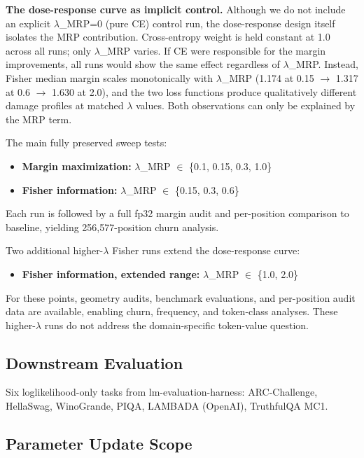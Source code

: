 \documentclass[
  11pt,
]{article}
\providecommand{\tightlist}{%
  \setlength{\itemsep}{0pt}\setlength{\parskip}{0pt}}
\begin{document}
\textbf{The dose-response curve as implicit control.} Although we do not
include an explicit $\lambda$\_MRP=0 (pure CE) control run, the dose-response
design itself isolates the MRP contribution. Cross-entropy weight is
held constant at 1.0 across all runs; only $\lambda$\_MRP varies. If CE were
responsible for the margin improvements, all runs would show the same
effect regardless of $\lambda$\_MRP. Instead, Fisher median margin scales
monotonically with $\lambda$\_MRP (1.174 at 0.15 $\rightarrow$ 1.317 at 0.6 $\rightarrow$ 1.630 at 2.0),
and the two loss functions produce qualitatively different damage
profiles at matched $\lambda$ values. Both observations can only be explained by
the MRP term.

The main fully preserved sweep tests:

\begin{itemize}
\tightlist
\item
  \textbf{Margin maximization:} $\lambda$\_MRP $\in$ \{0.1, 0.15, 0.3, 1.0\}
\item
  \textbf{Fisher information:} $\lambda$\_MRP $\in$ \{0.15, 0.3, 0.6\}
\end{itemize}

Each run is followed by a full fp32 margin audit and per-position
comparison to baseline, yielding 256,577-position churn analysis.

Two additional higher-$\lambda$ Fisher runs extend the dose-response curve:

\begin{itemize}
\tightlist
\item
  \textbf{Fisher information, extended range:} $\lambda$\_MRP $\in$ \{1.0, 2.0\}
\end{itemize}

For these points, geometry audits, benchmark evaluations, and
per-position audit data are available, enabling churn, frequency, and
token-class analyses. These higher-$\lambda$ runs do not address the
domain-specific token-value question.

\hypertarget{downstream-evaluation}{%
\subsection{Downstream Evaluation}\label{downstream-evaluation}}

Six loglikelihood-only tasks from lm-evaluation-harness: ARC-Challenge,
HellaSwag, WinoGrande, PIQA, LAMBADA (OpenAI), TruthfulQA MC1.

\hypertarget{parameter-update-scope}{%
\subsection{Parameter Update Scope}\label{parameter-update-scope}}
\end{document}
